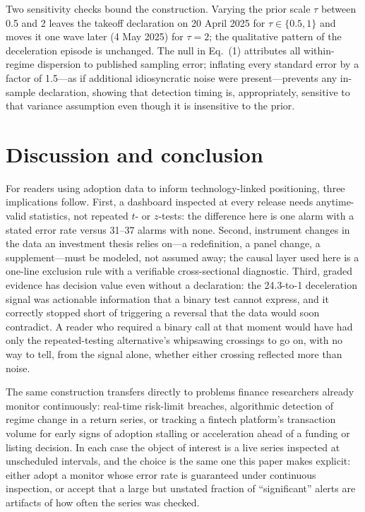 \documentclass[preprint,12pt]{elsarticle}
\begin{document}
Two sensitivity checks bound the construction. Varying the prior scale $\tau$ between 0.5 and 2 leaves the takeoff declaration on 20 April 2025 for $\tau\in\{0.5,1\}$ and moves it one wave later (4 May 2025) for $\tau=2$; the qualitative pattern of the deceleration episode is unchanged. The null in Eq.~(1) attributes all within-regime dispersion to published sampling error; inflating every standard error by a factor of 1.5---as if additional idiosyncratic noise were present---prevents any in-sample declaration, showing that detection timing is, appropriately, sensitive to that variance assumption even though it is insensitive to the prior.

\section{Discussion and conclusion}

For readers using adoption data to inform technology-linked positioning, three implications follow. First, a dashboard inspected at every release needs anytime-valid statistics, not repeated $t$- or $z$-tests: the difference here is one alarm with a stated error rate versus 31--37 alarms with none. Second, instrument changes in the data an investment thesis relies on---a redefinition, a panel change, a supplement---must be modeled, not assumed away; the causal layer used here is a one-line exclusion rule with a verifiable cross-sectional diagnostic. Third, graded evidence has decision value even without a declaration: the 24.3-to-1 deceleration signal was actionable information that a binary test cannot express, and it correctly stopped short of triggering a reversal that the data would soon contradict. A reader who required a binary call at that moment would have had only the repeated-testing alternative's whipsawing crossings to go on, with no way to tell, from the signal alone, whether either crossing reflected more than noise.

The same construction transfers directly to problems finance researchers already monitor continuously: real-time risk-limit breaches, algorithmic detection of regime change in a return series, or tracking a fintech platform's transaction volume for early signs of adoption stalling or acceleration ahead of a funding or listing decision. In each case the object of interest is a live series inspected at unscheduled intervals, and the choice is the same one this paper makes explicit: either adopt a monitor whose error rate is guaranteed under continuous inspection, or accept that a large but unstated fraction of ``significant'' alerts are artifacts of how often the series was checked.
\end{document}
